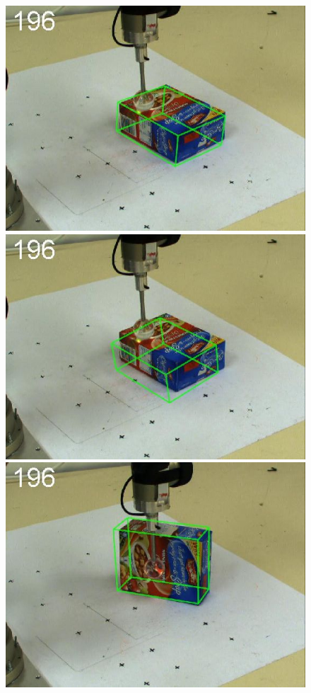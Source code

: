 \begin{figure}[htbp]
{\includegraphics[width=\imgAXwid]{images/A2_2exp_399_4}
\includegraphics[width=\imgAXwid]{images/A2_LWPR1_399_4}
\includegraphics[width=\imgAXwid]{images/A2_2exp_87_4}
}
\end{figure}
